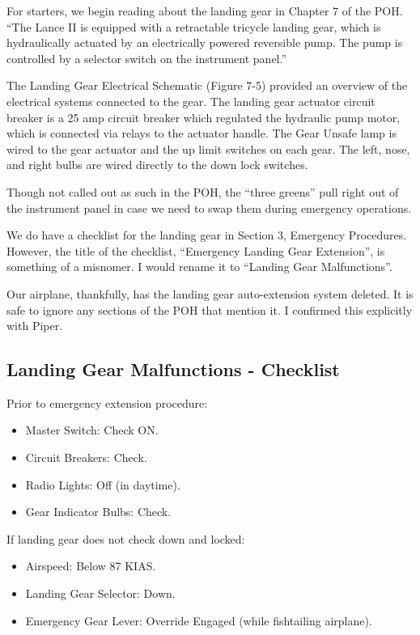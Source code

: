 For starters, we begin reading about the landing gear in Chapter 7 of the POH. ``The Lance II is equipped with a retractable tricycle landing gear, which is hydraulically actuated by an electrically powered reversible pump. The pump is controlled by a selector switch on the instrument panel.''

The Landing Gear Electrical Schematic (Figure 7-5) provided an overview of the electrical systems connected to the gear. The landing gear actuator circuit breaker is a 25 amp circuit breaker which regulated the hydraulic pump motor, which is connected via relays to the actuator handle. The Gear Unsafe lamp is wired to the gear actuator and the up limit switches on each gear. The left, nose, and right bulbs are wired directly to the down lock switches.

Though not called out as such in the POH, the ``three greens'' pull right out of the instrument panel in case we need to swap them during emergency operations.

We do have a checklist for the landing gear in Section 3, Emergency Procedures. However, the title of the checklist, ``Emergency Landing Gear Extension'', is something of a misnomer. I would rename it to ``Landing Gear Malfunctions''.

Our airplane, thankfully, has the landing gear auto-extension system deleted. It is safe to ignore any sections of the POH that mention it. I confirmed this explicitly with Piper.

\subsection{Landing Gear Malfunctions - Checklist}

Prior to emergency extension procedure:

\begin{itemize}
\item Master Switch: Check ON.
\item Circuit Breakers: Check.
\item Radio Lights: Off (in daytime).
\item Gear Indicator Bulbs: Check.
\end{itemize}

If landing gear does not check down and locked:
\begin{itemize}
\item Airspeed: Below 87 KIAS.
\item Landing Gear Selector: Down.
\item Emergency Gear Lever: Override Engaged (while fishtailing airplane).
\end{itemize}

